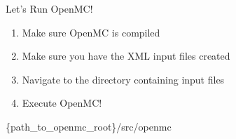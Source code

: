 \documentclass[serif]{beamer}
\begin{document}

\begin{frame}{Let's Run OpenMC!}

  \begin{enumerate}
    \item Make sure OpenMC is compiled
    \item Make sure you have the XML input files created
    \item Navigate to the directory containing input files
    \item Execute OpenMC!
  \end{enumerate}
  \vfill
  \begin{center}
    \alert{\{path\_to\_openmc\_root\}/src/openmc}
  \end{center}

\end{frame}

\end{document}
